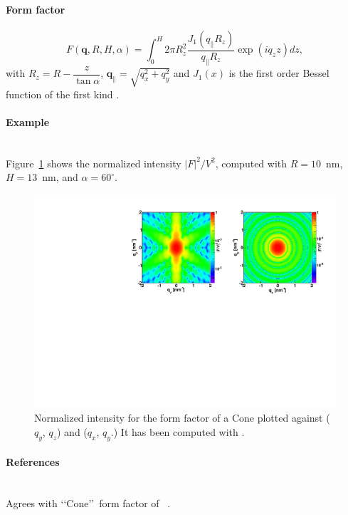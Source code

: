 \paragraph{Form factor}
\begin{equation*}
F(\mathbf{q}, R, H, \alpha) = \int_0 ^H 2\pi R_z^2
\frac{J_1(q_{\parallel}R_z)}{q_{\parallel} R_z}\exp(iq_z z)dz,
\end{equation*}
with $R_z =R-\dfrac{z}{\tan \alpha}$, $\mathbf{q}_{\parallel}=\sqrt{q_x^2+ q_y^2}$ and $J_1(x)$ is the first order
Bessel function of the first kind \cite{AbSt64}.


\paragraph{Example}\strut\\
Figure~\ref{fig:FFConeEx} shows the normalized intensity
$|F|^2/V^2$, computed with $R=10$~nm, $H=13$~nm, and $\alpha=60^{\circ}$.
\begin{figure}[h]
\begin{center}
\includegraphics[angle=-90,width=\textwidth]{fig/ff/figffcone.pdf}
\end{center}
\caption{Normalized intensity for the form factor of a Cone plotted against ($q_y$, $q_z$) and ($q_x$, $q_y$.) It
  has been  computed with .}
\label{fig:FFConeEx}
\end{figure}

\paragraph{References}\strut\\
Agrees with \lq\lq Cone\rq\rq\ form factor of \IsGISAXS~\cite{Laz02}.

